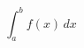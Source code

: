 \documentclass[a4paper,11pt]{jsarticle}
\begin{document}
\title{}
\author{}
\date{\today}
\maketitle
\begin{equation}
    \int_{a}^{b} f(x)\,dx
\end{equation}
\end{document}
